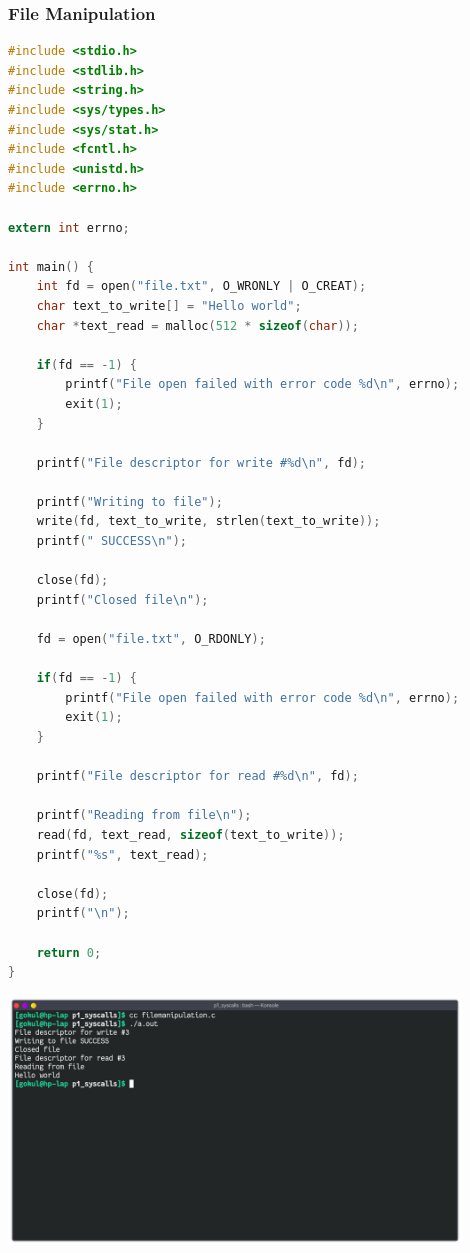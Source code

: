 \subsubsection{File Manipulation}
\begin{lstlisting}[language=C]
#include <stdio.h>
#include <stdlib.h>
#include <string.h>
#include <sys/types.h>
#include <sys/stat.h>
#include <fcntl.h>
#include <unistd.h>
#include <errno.h>

extern int errno;

int main() {
	int fd = open("file.txt", O_WRONLY | O_CREAT);
	char text_to_write[] = "Hello world";
	char *text_read = malloc(512 * sizeof(char));
	
	if(fd == -1) {
		printf("File open failed with error code %d\n", errno);
		exit(1);
	}

	printf("File descriptor for write #%d\n", fd);

	printf("Writing to file");
	write(fd, text_to_write, strlen(text_to_write));
	printf(" SUCCESS\n");

	close(fd);
	printf("Closed file\n");

	fd = open("file.txt", O_RDONLY);

	if(fd == -1) {
		printf("File open failed with error code %d\n", errno);
		exit(1);
	}

	printf("File descriptor for read #%d\n", fd);

	printf("Reading from file\n");
	read(fd, text_read, sizeof(text_to_write));
	printf("%s", text_read);

	close(fd);
	printf("\n");

	return 0;
}
\end{lstlisting}

\begin{center}
	\includegraphics[width=0.90\textwidth]{img/p2/ss2.png}
\end{center}

